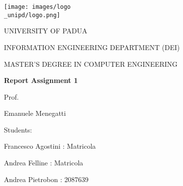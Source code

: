 \begin{titlepage}
    \begin{center}
        \texttt{[image: images/logo\\\_unipd/logo.png]}
        
        \vspace*{1cm}
        \Large
        \textmd{UNIVERSITY OF PADUA}
        
        \vspace*{1cm}
        \large
        \textmd{INFORMATION ENGINEERING DEPARTMENT (DEI)}
                
        \vspace*{0.5cm}
        \large
        \textmd{MASTER'S DEGREE IN COMPUTER ENGINEERING} 
                
        \vspace*{1cm}
        \Huge
        \textbf{Report Assignment 1}
        
        
        \raggedright
        \vspace*{1cm}
        \large
        \textmd{Prof.}
        
        \textmd{Emanuele Menegatti}
        
        \raggedleft
        \vspace*{0.5cm}
        \large
        \textmd{Students:}
                
        \textmd{Francesco Agostini : Matricola}       
        
        \textmd{Andrea Felline : Matricola}        
        
        \textmd{Andrea Pietrobon : 2087639}
        
    \end{center}
\end{titlepage}
